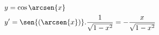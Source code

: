 \begin{ex}
\begin{align}
&y=\cos{\arcsen{x}}\nonumber\\
&y'= \sen{(\arcsen{x})}.\frac{1}{\sqrt{1-x^2}}=-\frac{x}{\sqrt{1-x^2}}\nonumber
\end{align}
\end{ex}